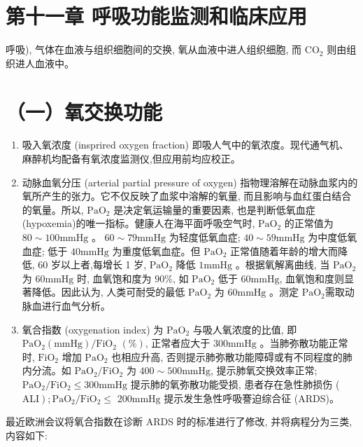 \documentclass[10pt]{article}
\begin{document}
\section*{第十一章 呼吸功能监测和临床应用}
呼吸), 气体在血液与组织细胞间的交换, 氧从血液中进人组织细胞, 而 $\mathrm{CO}_{2}$ 则由组织进人血液中。

\section*{（一）氧交换功能}
\begin{enumerate}
  \item 吸入氧浓度 (insprired oxygen fraction) 即吸人气中的氧浓度。现代通气机、麻醉机均配备有氧浓度监测仪,但应用前均应校正。

  \item 动脉血氧分压 (arterial partial pressure of oxygen) 指物理溶解在动脉血浆内的氧所产生的张力。它不仅反映了血浆中溶解的氧量, 而且影响与血红蛋白结合的氧量。所以, $\mathrm{PaO}_{2}$ 是决定氧运输量的重要因素, 也是判断低氧血症 (hypoxemia)的唯一指标。健康人在海平面呼吸空气时, $\mathrm{PaO}_{2}$ 的正常值为 $80 \sim 100 \mathrm{mmHg}$ 。 $60 \sim 79 \mathrm{mmHg}$ 为轻度低氧血症; $40 \sim 59 \mathrm{mmHg}$ 为中度低氧血症; 低于 $40 \mathrm{mmHg}$ 为重度低氧血症。但 $\mathrm{PaO}_{2}$ 正常值随着年龄的增大而降低, 60 岁以上者,每增长 1 岁, $\mathrm{PaO}_{2}$ 降低 $1 \mathrm{mmHg}$ 。根据氧解离曲线, 当 $\mathrm{PaO}_{2}$ 为 $60 \mathrm{mmHg}$ 时, 血氧饱和度为 $90 \%$, 如 $\mathrm{PaO}_{2}$ 低于 $60 \mathrm{mmHg}$, 血氧饱和度则显著降低。因此认为, 人类可耐受的最低 $\mathrm{PaO}_{2}$ 为 $60 \mathrm{mmHg}$ 。测定 $\mathrm{PaO}_{2}$需取动脉血进行血气分析。

  \item 氧合指数 (oxygenation index) 为 $\mathrm{PaO}_{2}$ 与吸人氧浓度的比值, 即 $\mathrm{PaO}_{2}(\mathrm{mmHg}) / \mathrm{FiO}_{2}$ $(\%)$, 正常者应大于 $300 \mathrm{mmHg}$ 。当肺弥散功能正常时, $\mathrm{FiO}_{2}$ 增加 $\mathrm{PaO}_{2}$ 也相应升高, 否则提示肺弥散功能障碍或有不同程度的肺内分流。如 $\mathrm{PaO}_{2} / \mathrm{FiO}_{2}$ 为 $400 \sim 500 \mathrm{mmHg}$, 提示肺氧交换效率正常; $\mathrm{PaO}_{2} / \mathrm{FiO}_{2} \leqslant 300 \mathrm{mmHg}$ 提示肺的氧弥散功能受损, 患者存在急性肺损伤 ( $\left.\mathrm{ALI}\right) ; \mathrm{PaO}_{2} / \mathrm{FiO}_{2} \leqslant$ $200 \mathrm{mmHg}$ 提示发生急性呼吸謇迫综合征 (ARDS)。

\end{enumerate}

最近欧洲会议将氧合指数在诊断 ARDS 时的标准进行了修改, 并将病程分为三类, 内容如下:
\end{document}

